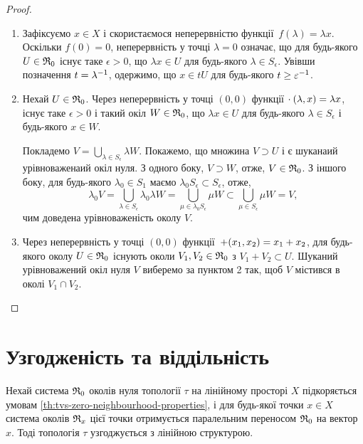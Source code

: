 \begin{proof}
    \listhack
    \begin{enumerate}
        \item Зафіксуємо $x \in X$ і скористаємося неперервністю функції~$f(\lambda) = \lambda x$. Оскільки $f(0) = 0$, неперервність у точці $\lambda = 0$ означає, що для будь-якого $U \in \frak R_0$ існує таке $\epsilon > 0$, що $\lambda x \in U$ для будь-якого $\lambda \in S_\epsilon$. Увівши позначення $t = \lambda\inv$, одержимо, що $x \in t U$ для будь-якого $t \ge \epsilon\inv$.

        \item Нехай $U \in \frak R_0$. Через неперервність у точці $(0, 0)$ функції $\MultiplicationFunction\:(\lambda, x) = \lambda x$, існує таке $\epsilon > 0$ і такий окіл $W \in \frak R_0$, що $\lambda x \in U$ для будь-якого $\lambda \in S_\epsilon$ і будь-якого $x \in W$.
        
        Покладемо $V = \bigcup_{\lambda \in S_\epsilon} \lambda W$. Покажемо, що множина $V \supset U$ і є шуканаий урівноваженаий окіл нуля. З одного боку, $V \supset W$, отже, $V \in \frak R_0$. З іншого боку, для будь-якого $\lambda_0 \in S_1$ маємо $\lambda_0 S_\epsilon \subset S_\epsilon$, отже,
        \begin{equation*}
            \lambda_0 V = \bigcup_{\lambda \in S_\epsilon} \lambda_0 \lambda W = \bigcup_{\mu \in \lambda_0 S_\epsilon} \mu W \subset \bigcup_{\mu \in S_\epsilon} \mu W = V,
        \end{equation*}
        чим доведена урівноваженість околу $V$.
    
        \item Через неперервність у точці $(0, 0)$ функції~$\AdditionFunction (x_1, x_2) = x_1 + x_2$, для будь-якого околу $U \in \frak R_0$ існують околи $V_1, V_2 \in \frak R_0$ з $V_1 + V_2 \subset U$. Шуканий урівноважений окіл нуля $V$ виберемо за пунктом 2 так, щоб $V$ містився в околі $V_1 \cap V_2$. \qedhere
    \end{enumerate}
\end{proof}

\section{Узгодженість та віддільність}

\begin{theorem}
    Нехай система $\frak R_0$ околів нуля топології $\tau$ на лінійному просторі $X$ підкоряється умовам \cref{th:tvs-zero-neighbourhood-properties}, і для будь-якої точки $x \in X$ система околів $\frak R_x$ цієї точки отримується паралельним переносом $\frak R_0$ на вектор $x$. Тоді топологія $\tau$ узгоджується з лінійною структурою.
\end{theorem}

